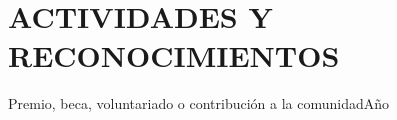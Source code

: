 \section{ACTIVIDADES Y RECONOCIMIENTOS}
Premio, beca, voluntariado o contribución a la comunidad\hfill{\small Año}
